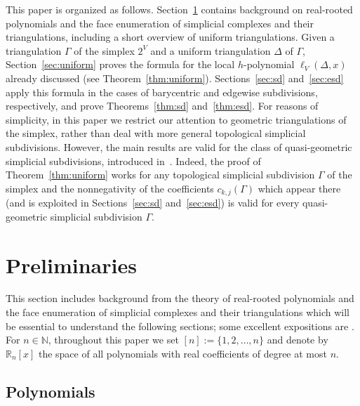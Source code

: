 \documentclass[11pt]{amsart}
\newcommand{\RR}{{\mathbb R}}
\newcommand{\NN}{{\mathbb N}}
\begin{document}
This paper is organized as follows. 
Section~\ref{sec:pre} contains background on 
real-rooted polynomials and the face enumeration
of simplicial complexes and their triangulations,
including a short overview of uniform 
triangulations. Given a triangulation $\Gamma$ 
of the simplex $2^V$ and a uniform triangulation 
$\Delta$ of $\Gamma$, Section~\ref{sec:uniform} 
proves the formula for the local $h$-polynomial 
$\ell_V(\Delta, x)$ already discussed (see 
Theorem~\ref{thm:uniform}). Sections~\ref{sec:sd} 
and~\ref{sec:esd} apply this formula in the cases 
of barycentric and edgewise subdivisions, 
respectively, and prove Theorems~\ref{thm:sd} 
and~\ref{thm:esd}. For reasons of simplicity, in 
this paper we restrict our attention to geometric 
triangulations of the simplex, rather than deal 
with more general topological simplicial 
subdivisions. However, the main results are valid 
for the class of quasi-geometric simplicial 
subdivisions, introduced in~\cite{Sta92}. Indeed, 
the proof of Theorem~\ref{thm:uniform} works for 
any topological simplicial subdivision $\Gamma$ 
of the simplex and the nonnegativity of the 
coefficients $c_{k,j}(\Gamma)$ which appear there 
(and is exploited in Sections~\ref{sec:sd} 
and~\ref{sec:esd}) is valid for every 
quasi-geometric simplicial subdivision $\Gamma$.

\section{Preliminaries}
\label{sec:pre}

This section includes background from the theory 
of real-rooted polynomials and the face enumeration 
of simplicial complexes and their triangulations 
which will be essential to understand the following
sections; some excellent expositions are \cite{Bj95,
Bra15, StaCCA}. For $n \in \NN$, throughout this 
paper we set $[n] := \{1, 2,\dots,n\}$ and denote 
by $\RR_n [x]$ the space of all polynomials with 
real coefficients of degree at most $n$.

\subsection{Polynomials} 
\label{subsec:polys}
\end{document}
